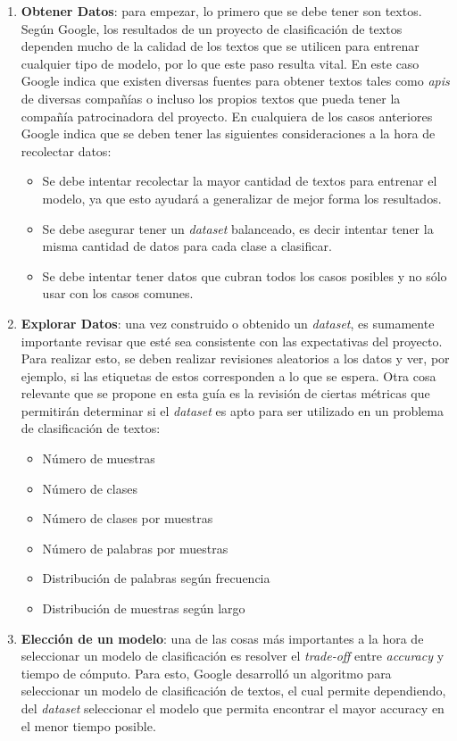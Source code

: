     \begin{enumerate}
        \item \textbf{Obtener Datos}: para empezar, lo primero que se debe tener son textos. Según Google, los resultados de un proyecto de clasificación de textos dependen mucho de la calidad de los textos que se utilicen para entrenar cualquier tipo de modelo, por lo que este paso resulta vital.  En este caso Google indica que existen diversas fuentes para obtener textos tales como \textit{apis} de diversas compañías o incluso los propios textos que pueda tener la compañía patrocinadora del proyecto. En cualquiera de los casos anteriores Google indica que se deben tener las siguientes consideraciones a la hora de recolectar datos:
        \begin{itemize}
            \item Se debe intentar recolectar la mayor cantidad de textos para entrenar el modelo, ya que esto ayudará a generalizar de mejor forma los resultados.
            \item Se debe asegurar tener un \textit{dataset} balanceado, es decir intentar tener la misma cantidad de datos para cada clase a clasificar.
            \item Se debe intentar tener datos que cubran todos los casos posibles y no sólo usar con los casos comunes. 
        \end{itemize}
       \item \textbf{Explorar Datos}: una vez construido o obtenido un \textit{dataset}, es sumamente importante revisar que esté sea consistente con las expectativas del proyecto. Para realizar esto, se deben realizar revisiones aleatorios a los datos y ver, por ejemplo, si las etiquetas de estos corresponden a lo que se espera.
       Otra cosa relevante que se propone en esta guía es la revisión de ciertas métricas que permitirán determinar si el \textit{dataset} es apto para ser utilizado en un problema de clasificación de textos:
       \begin{itemize}
           \item Número de muestras
           \item Número de clases
           \item Número de clases por muestras
           \item Número de palabras por muestras
           \item Distribución de palabras según frecuencia
           \item Distribución de muestras según largo
       \end{itemize}   
      \item \textbf{Elección de un modelo}: una de las cosas más importantes a la hora de seleccionar un modelo de clasificación es resolver el \textit{trade-off} entre \textit{accuracy} y tiempo de cómputo. Para esto, Google desarrolló un algoritmo para seleccionar un modelo de clasificación de textos, el cual permite dependiendo, del \textit{dataset} seleccionar el modelo que permita encontrar el mayor accuracy en el menor tiempo posible. 


\end{enumerate}
